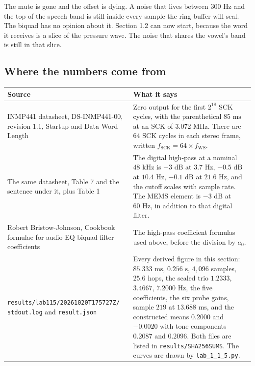 \documentclass[11pt,a4paper]{article}
\begin{document}
The mute is gone and the offset is dying. A noise that lives between $300\text{ Hz}$ and the top of the speech band is still inside every sample the ring buffer will seal. The biquad has no opinion about it. Section 1.2 can now start, because the word it receives is a slice of the pressure wave. The noise that shares the vowel's band is still in that slice.

\subsection*{Where the numbers come from}

\begin{center}
\small
\begin{tabular}{p{} p{}}
\toprule
Source & What it says \\
\midrule
INMP441 datasheet, DS-INMP441-00, revision 1.1, Startup and Data Word Length &
Zero output for the first $2^{18}$ SCK cycles, with the parenthetical $85\text{ ms}$ at an SCK of $3.072\text{ MHz}$. There are 64 SCK cycles in each stereo frame, written $f_{\mathrm{SCK}} = 64 \times f_{\mathrm{WS}}$. \\
\addlinespace
The same datasheet, Table 7 and the sentence under it, plus Table 1 &
The digital high-pass at a nominal $48\text{ kHz}$ is $-3\text{ dB}$ at $3.7\text{ Hz}$, $-0.5\text{ dB}$ at $10.4\text{ Hz}$, $-0.1\text{ dB}$ at $21.6\text{ Hz}$, and the cutoff scales with sample rate. The MEMS element is $-3\text{ dB}$ at $60\text{ Hz}$, in addition to that digital filter. \\
\addlinespace
Robert Bristow-Johnson, Cookbook formulae for audio EQ biquad filter coefficients &
The high-pass coefficient formulas used above, before the division by $a_0$. \\
\addlinespace
\texttt{results/lab115/20261020T175727Z/} \texttt{stdout.log} and \texttt{result.json} &
Every derived figure in this section: $85.333\text{ ms}$, $0.256\text{ s}$, $4{,}096$ samples, $25.6$ hops, the scaled trio $1.2333$, $3.4667$, $7.2000\text{ Hz}$, the five coefficients, the six probe gains, sample $219$ at $13.688\text{ ms}$, and the constructed means $0.2000$ and $-0.0020$ with tone components $0.2087$ and $0.2096$. Both files are listed in \texttt{results/SHA256SUMS}. The curves are drawn by \texttt{lab\_1\_1\_5.py}. \\
\bottomrule
\end{tabular}
\end{center}
\end{document}
